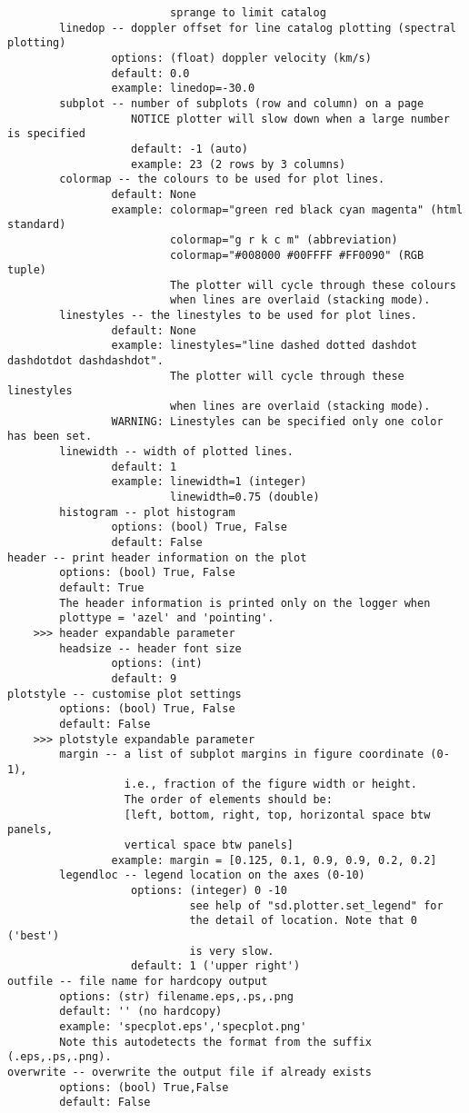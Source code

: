 \begin{verbatim}
                         sprange to limit catalog
        linedop -- doppler offset for line catalog plotting (spectral plotting)
                options: (float) doppler velocity (km/s)
                default: 0.0
                example: linedop=-30.0
        subplot -- number of subplots (row and column) on a page
                   NOTICE plotter will slow down when a large number is specified
                   default: -1 (auto)
                   example: 23 (2 rows by 3 columns)
        colormap -- the colours to be used for plot lines. 
                default: None
                example: colormap="green red black cyan magenta" (html standard)
                         colormap="g r k c m" (abbreviation)
                         colormap="#008000 #00FFFF #FF0090" (RGB tuple)
                         The plotter will cycle through these colours 
                         when lines are overlaid (stacking mode).
        linestyles -- the linestyles to be used for plot lines. 
                default: None
                example: linestyles="line dashed dotted dashdot dashdotdot dashdashdot". 
                         The plotter will cycle through these linestyles 
                         when lines are overlaid (stacking mode). 
                WARNING: Linestyles can be specified only one color has been set. 
        linewidth -- width of plotted lines. 
                default: 1
                example: linewidth=1 (integer)
                         linewidth=0.75 (double)
        histogram -- plot histogram
                options: (bool) True, False
                default: False
header -- print header information on the plot
        options: (bool) True, False
        default: True
        The header information is printed only on the logger when 
        plottype = 'azel' and 'pointing'. 
    >>> header expandable parameter
        headsize -- header font size
                options: (int)
                default: 9
plotstyle -- customise plot settings
        options: (bool) True, False
        default: False
    >>> plotstyle expandable parameter
        margin -- a list of subplot margins in figure coordinate (0-1), 
                  i.e., fraction of the figure width or height.
                  The order of elements should be:
                  [left, bottom, right, top, horizontal space btw panels,
                  vertical space btw panels]
                example: margin = [0.125, 0.1, 0.9, 0.9, 0.2, 0.2]
        legendloc -- legend location on the axes (0-10)
                   options: (integer) 0 -10 
                            see help of "sd.plotter.set_legend" for 
                            the detail of location. Note that 0 ('best')
                            is very slow. 
                   default: 1 ('upper right')
outfile -- file name for hardcopy output
        options: (str) filename.eps,.ps,.png
        default: '' (no hardcopy)
        example: 'specplot.eps','specplot.png'
        Note this autodetects the format from the suffix (.eps,.ps,.png).
overwrite -- overwrite the output file if already exists
        options: (bool) True,False
        default: False
\end{verbatim}

